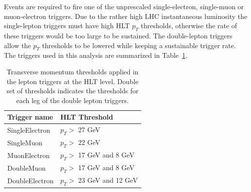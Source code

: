 Events are required to fire one of the unprescaled single-electron, single-muon or
muon-electron triggers. Due to the rather high LHC instantaneous luminosity the
single-lepton triggers must have high HLT $p_T$ thresholds, otherwise the rate of these
triggers would be too large to be sustained. The double-lepton triggers allow the $p_T$
thresholds to be lowered while keeping a sustainable trigger rate.
The triggers used in this analysis are summarized in Table~\ref{tab:triggers}. 
\begin{table}
\begin{center}
\begin{tabular}{|l|l|}
   \hline
   Trigger name & HLT Threshold \\
   \hline
   
   SingleElectron & $p_T>$ 27 GeV  \\

   \hline
        
   SingleMuon   &  $p_T>$ 22 GeV  \\

   \hline
   
   MuonElectron       &  $p_T>$ 17 GeV  and 8 GeV  \\
   
   \hline
   
   DoubleMuon   & $p_T>$ 17 GeV  and 8 GeV  \\
      
   \hline
   
   DoubleElectron   &  $p_T>$ 23 GeV  and 12 GeV    \\
   
   \hline
\end{tabular}
\caption{Transverse momentum thresholds applied in the lepton triggers at the HLT
level. Double set of thresholds indicates the thresholds for each leg of the double lepton
triggers.}
\label{tab:triggers}  
\end{center}
\end{table}\\
